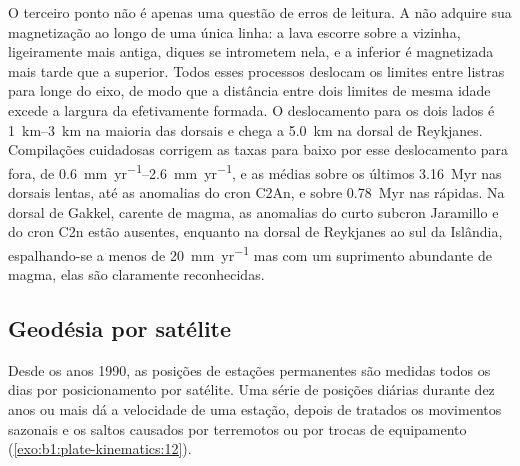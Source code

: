 O terceiro ponto não é apenas uma questão de erros de leitura. A  não
adquire sua magnetização ao longo de uma única linha: a lava escorre sobre a
 vizinha, ligeiramente mais antiga, diques se intrometem nela, e a  inferior é magnetizada
mais tarde que a superior. Todos esses processos deslocam os limites entre listras
para longe do eixo, de modo que a distância entre dois limites de mesma idade
excede a largura da  efetivamente formada. O deslocamento para os dois lados é
\qtyrange{1}{3}{km} na maioria das dorsais e chega a \qty{5.0}{km} na dorsal de Reykjanes. Compilações cuidadosas corrigem as taxas para baixo por esse deslocamento para fora,
de \qtyrange{0.6}{2.6}{mm.yr^{-1}}, e as médias sobre os últimos
\qty{3.16}{Myr} nas dorsais lentas, até as anomalias do cron C2An, e
sobre \qty{0.78}{Myr} nas rápidas. Na dorsal de Gakkel, carente de magma, as
anomalias do curto subcron Jaramillo e do cron C2n estão ausentes, enquanto na
dorsal de Reykjanes ao sul da Islândia, espalhando-se a menos de
\qty{20}{mm.yr^{-1}} mas com um suprimento abundante de magma, elas são claramente
reconhecidas.

\subsection*{Geodésia por satélite}

Desde os anos 1990, as posições de estações permanentes são medidas todos os
dias por posicionamento por satélite. Uma série de posições diárias durante dez anos ou
mais dá a velocidade de uma estação, depois de tratados os movimentos sazonais e os saltos
causados por terremotos ou por trocas de equipamento
(\cref{exo:b1:plate-kinematics:12}).

